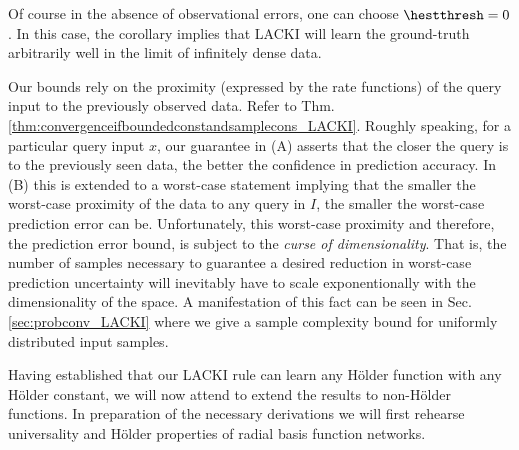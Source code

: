 %
%
%

Of course in the absence of observational errors, one can choose $\hestthresh = 0$. In this case, the corollary implies that LACKI will learn the ground-truth arbitrarily well in the limit of infinitely dense data.

\begin{remark} 
Our bounds rely on the proximity (expressed by the rate functions) of the query input to the previously observed data.
Refer to Thm. \ref{thm:convergenceifboundedconstandsamplecons_LACKI}.
Roughly speaking, for a particular query input $x$, our guarantee in (A) asserts that the closer the query is to the previously seen data, the better the confidence in prediction accuracy. In (B) this is extended to a worst-case statement implying that the smaller the worst-case proximity of the data to any query in $I$, the smaller the worst-case prediction error can be. 
Unfortunately, this worst-case proximity and therefore, the prediction error bound, is subject to the \emph{curse of dimensionality}. That is, the number of samples necessary to guarantee a desired reduction in worst-case prediction uncertainty will inevitably have to scale exponentionally with the dimensionality of the space. A manifestation of this fact can be seen in Sec. \ref{sec:probconv_LACKI} where we give a sample complexity bound for uniformly distributed input samples. 
\end{remark}


Having established that our LACKI rule can learn any H\"older function with any H\"older constant, we will now attend to extend the results to non-H\"older functions. In preparation of the necessary derivations we will first rehearse universality and H\"older properties of radial basis function networks. 

